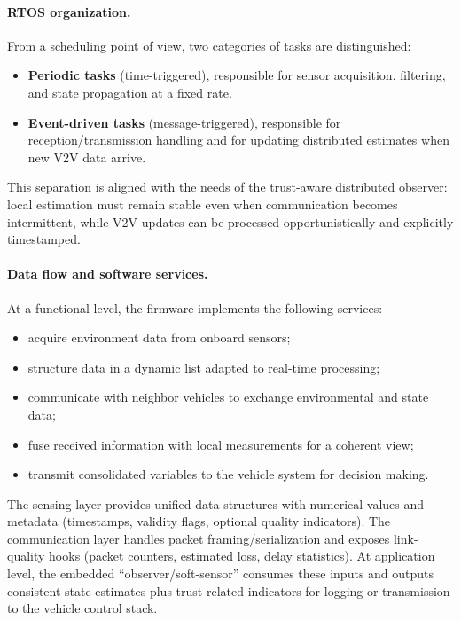 \paragraph{RTOS organization.}
From a scheduling point of view, two categories of tasks are distinguished:
\begin{itemize}
    \item \textbf{Periodic tasks} (time-triggered), responsible for sensor acquisition, filtering, and state propagation at a fixed rate.
    \item \textbf{Event-driven tasks} (message-triggered), responsible for reception/transmission handling and for updating distributed estimates when new V2V data arrive.
\end{itemize}
This separation is aligned with the needs of the trust-aware distributed observer: local estimation must remain stable even when communication becomes intermittent, while V2V updates can be processed opportunistically and explicitly timestamped.

\paragraph{Data flow and software services.}
At a functional level, the firmware implements the following services:
\begin{itemize}
	\item acquire environment data from onboard sensors;
	\item structure data in a dynamic list adapted to real-time processing;
	\item communicate with neighbor vehicles to exchange environmental and state data;
	\item fuse received information with local measurements for a coherent view;
	\item transmit consolidated variables to the vehicle system for decision making.
\end{itemize}
The sensing layer provides unified data structures with numerical values and metadata (timestamps, validity flags, optional quality indicators).
The communication layer handles packet framing/serialization and exposes link-quality hooks (packet counters, estimated loss, delay statistics).
At application level, the embedded ``observer/soft-sensor'' consumes these inputs and outputs consistent state estimates plus trust-related indicators for logging or transmission to the vehicle control stack.

